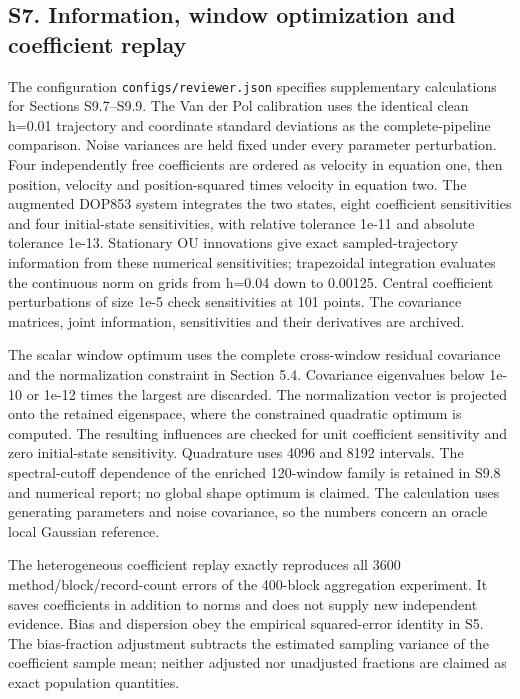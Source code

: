 \documentclass[
  american,
  11pt,
]{article}
\begin{document}
\subsection{S7. Information, window optimization and coefficient
replay}\label{s7.-information-window-optimization-and-coefficient-replay}

The configuration \texttt{configs/reviewer.json} specifies supplementary
calculations for Sections S9.7--S9.9. The Van der Pol calibration uses
the identical clean h=0.01 trajectory and coordinate standard deviations
as the complete-pipeline comparison. Noise variances are held fixed
under every parameter perturbation. Four independently free coefficients
are ordered as velocity in equation one, then position, velocity and
position-squared times velocity in equation two. The augmented DOP853
system integrates the two states, eight coefficient sensitivities and
four initial-state sensitivities, with relative tolerance 1e-11 and
absolute tolerance 1e-13. Stationary OU innovations give exact
sampled-trajectory information from these numerical sensitivities;
trapezoidal integration evaluates the continuous norm on grids from
h=0.04 down to 0.00125. Central coefficient perturbations of size 1e-5
check sensitivities at 101 points. The covariance matrices, joint
information, sensitivities and their derivatives are archived.

The scalar window optimum uses the complete cross-window residual
covariance and the normalization constraint in Section 5.4. Covariance
eigenvalues below 1e-10 or 1e-12 times the largest are discarded. The
normalization vector is projected onto the retained eigenspace, where
the constrained quadratic optimum is computed. The resulting influences
are checked for unit coefficient sensitivity and zero initial-state
sensitivity. Quadrature uses 4096 and 8192 intervals. The
spectral-cutoff dependence of the enriched 120-window family is retained
in S9.8 and numerical report; no global shape optimum is claimed. The
calculation uses generating parameters and noise covariance, so the
numbers concern an oracle local Gaussian reference.

The heterogeneous coefficient replay exactly reproduces all 3600
method/block/record-count errors of the 400-block aggregation
experiment. It saves coefficients in addition to norms and does not
supply new independent evidence. Bias and dispersion obey the empirical
squared-error identity in S5. The bias-fraction adjustment subtracts the
estimated sampling variance of the coefficient sample mean; neither
adjusted nor unadjusted fractions are claimed as exact population
quantities.
\end{document}
